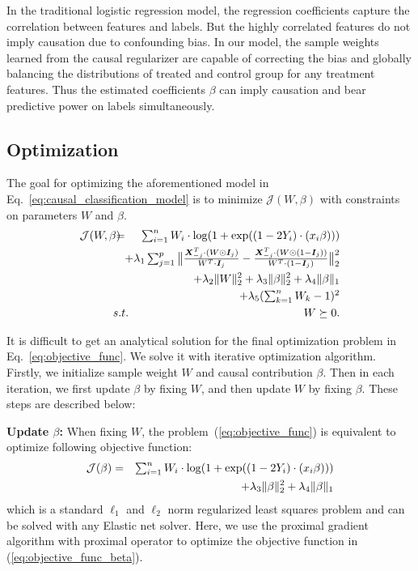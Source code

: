 \documentclass[sigconf]{acmart}
\newcommand*{\Scale}[2][4]{\scalebox{#1}{$#2$}}
\begin{document}
In the traditional logistic regression model, the regression coefficients capture the correlation between features and labels.
But the highly correlated features do not imply causation due to confounding bias.
In our model, the sample weights learned from the causal regularizer are capable of correcting the bias and globally balancing the distributions of treated and control group for any treatment features.
Thus the estimated coefficients $\beta$ can imply causation and bear predictive power on labels simultaneously.

\subsection{Optimization}
The goal for optimizing the aforementioned model in Eq.~\ref{eq:causal_classification_model} is to minimize $\mathcal{J}(W, \beta)$ with constraints on parameters $W$ and $\beta$.
\begin{eqnarray}
\label{eq:objective_func}
\mathcal{J}(W, \beta)\!\!\!\! &=& \!\!\!\! \Scale[1.0]{\sum_{i=1}^{n}W_i\cdot \log(1+\exp((1-2Y_i)\cdot (x_i\beta)))} \\
\nonumber&& \!\!\!\!\!\!\!\! + \Scale[1.0]{\lambda_1 \sum_{j=1}^{p} \big\|\frac{\bm{X}_{-j}^{T}\cdot(W\odot \bm{I}_j)}{W^{T}\cdot \bm{I}_j}-\frac{\bm{X}_{-j}^{T}\cdot(W\odot (1-\bm{I}_j))}{W^{T}\cdot (1-\bm{I}_j)}\big\|_2^2}\\
\nonumber&& \!\!\!\!\!\!\!\! + \lambda_2 \|W\|_2^2 + \lambda_3\|\beta\|_2^2 + \lambda_4\|\beta\|_1 \\
\nonumber&& \!\!\!\!\!\!\!\! + \Scale[1.0]{\lambda_5 (\sum_{k=1}^{n}W_k-1)^{2}} \\
\nonumber &s.t.& W\succeq 0.
\end{eqnarray}

It is difficult to get an analytical solution for the final optimization problem in Eq.~\ref{eq:objective_func}.
We solve it with iterative optimization algorithm.
Firstly, we initialize sample weight $W$ and causal contribution $\beta$.
Then in each iteration, we first update $\beta$ by fixing $W$, and then update $W$ by fixing $\beta$.
These steps are described below:

\par\noindent\textbf{Update $\beta$:} When fixing $W$, the problem~(\ref{eq:objective_func}) is equivalent to optimize following objective function:
\begin{eqnarray}
\label{eq:objective_func_beta}
\mathcal{J}(\beta) &=& \Scale[1.0]{\sum_{i=1}^{n}W_i\cdot \log(1+\exp((1-2Y_i)\cdot (x_i\beta)))} \\
\nonumber&& + \lambda_3\|\beta\|_2^2 + \lambda_4\|\beta\|_1
\end{eqnarray}
which is a standard $\ell_1$ and $\ell_2$ norm regularized least squares problem and can be solved with any Elastic net solver.
Here, we use the proximal gradient algorithm \cite{parikh2014proximal} with proximal operator to optimize the objective function in (\ref{eq:objective_func_beta}).
\end{document}
